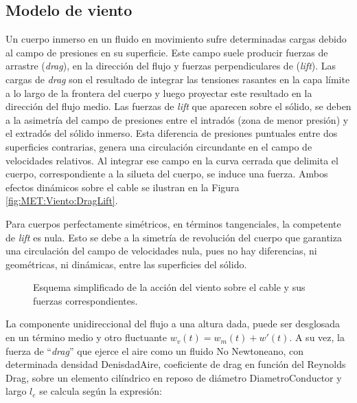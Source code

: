 \subsection{Modelo de viento}\label{Sec:PRE:Modeloviento}
Un cuerpo inmerso en un fluido en movimiento sufre determinadas cargas debido al campo de presiones en su superficie. Este campo suele producir fuerzas de arrastre (\textit{drag}), en la dirección del flujo y fuerzas perpendiculares de (\textit{lift}). Las cargas de \textit{drag} son el resultado de integrar las tensiones rasantes en la capa límite a lo largo de la frontera del cuerpo y luego proyectar este resultado en la dirección del flujo medio. Las fuerzas de \textit{lift} que aparecen sobre el sólido, se deben a la asimetría del campo de presiones entre el intradós (zona de menor presión) y el extradós del sólido inmerso. Esta diferencia de presiones puntuales entre dos superficies contrarias, genera una circulación circundante en el campo de velocidades relativos. Al integrar ese campo en la curva cerrada que delimita el cuerpo, correspondiente a la silueta del cuerpo, se induce una fuerza. Ambos efectos dinámicos sobre el cable se ilustran en la Figura \ref{fig:MET:Viento:DragLift}. 

Para cuerpos perfectamente simétricos, en términos tangenciales, la competente de \textit{lift} es nula.  Esto se debe a la simetría de revolución del cuerpo que garantiza una circulación del campo de velocidades nula, pues no hay diferencias, ni geométricas, ni dinámicas, entre las superficies del sólido. 

\begingroup
\begin{figure}[htbp]
	\centering
	\caption{Esquema simplificado de la acción del viento sobre el cable y sus fuerzas correspondientes.} 	\label{fig:Met:Viento:Esquemas}
\end{figure}
\endgroup

La componente unidireccional del flujo a una altura dada, puede ser desglosada en un término medio y otro fluctuante $w_v(t)=w_m(t)+{w}'(t)$. A su vez, la fuerza de ``\textit{drag}'' que ejerce el aire como un fluido No Newtoneano, con determinada densidad \gls{DenisdadAire}, coeficiente de drag en función del Reynolds \gls{Drag}, sobre un elemento cilíndrico en reposo de diámetro \gls{DiametroConductor} y largo $l_e$ se calcula según la expresión:


